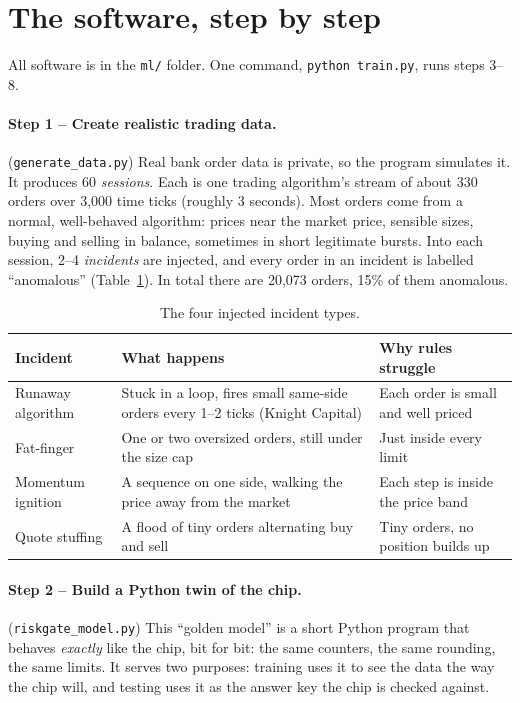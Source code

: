 \documentclass[11pt,a4paper]{article}
\newcommand{\code}[1]{\texttt{#1}}
\newcommand{\step}[2]{\paragraph{Step #1 -- #2.}}
\begin{document}
\section{The software, step by step}

All software is in the \code{ml/} folder. One command, \code{python train.py}, runs steps 3--8.

\step{1}{Create realistic trading data} (\code{generate\_data.py})
Real bank order data is private, so the program simulates it. It produces 60 \emph{sessions}.
Each is one trading algorithm's stream of about 330 orders over 3{,}000 time ticks
(roughly 3 seconds). Most orders come from a normal, well-behaved algorithm: prices near the
market price, sensible sizes, buying and selling in balance, sometimes in short legitimate bursts.
Into each session, 2--4 \emph{incidents} are injected, and every order in an incident is
labelled ``anomalous'' (Table~\ref{tab:scen}). In total there are 20{,}073 orders, 15\%
of them anomalous.

\begin{table}[H]
\centering\small
\begin{tabularx}{\linewidth}{@{}lXX@{}}
\toprule
Incident & What happens & Why rules struggle \\
\midrule
Runaway algorithm & Stuck in a loop, fires small same-side orders every 1--2 ticks (Knight Capital) & Each order is small and well priced \\
Fat-finger & One or two oversized orders, still under the size cap & Just inside every limit \\
Momentum ignition & A sequence on one side, walking the price away from the market & Each step is inside the price band \\
Quote stuffing & A flood of tiny orders alternating buy and sell & Tiny orders, no position builds up \\
\bottomrule
\end{tabularx}
\caption{The four injected incident types.}
\label{tab:scen}
\end{table}

\step{2}{Build a Python twin of the chip} (\code{riskgate\_model.py})
This ``golden model'' is a short Python program that behaves \emph{exactly} like the chip, bit for
bit: the same counters, the same rounding, the same limits. It serves two purposes: training
uses it to see the data the way the chip will, and testing uses it as the answer key the chip is
checked against.
\end{document}
